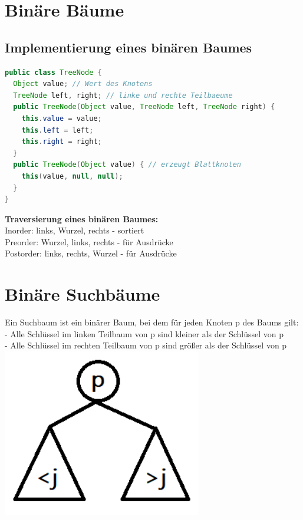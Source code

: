 \documentclass{scrreprt}
\begin{document}
\section{Binäre Bäume}
\subsection{Implementierung eines binären Baumes}
\begin{lstlisting}[language=Java]
public class TreeNode {
  Object value; // Wert des Knotens
  TreeNode left, right; // linke und rechte Teilbaeume
  public TreeNode(Object value, TreeNode left, TreeNode right) {
    this.value = value;
    this.left = left;
    this.right = right;
  }
  public TreeNode(Object value) { // erzeugt Blattknoten
    this(value, null, null);
  }
}
\end{lstlisting}
\textbf{Traversierung eines binären Baumes:}
\\ Inorder: links, Wurzel, rechts - sortiert
\\ Preorder: Wurzel, links, rechts - für Ausdrücke
\\ Postorder: links, rechts, Wurzel - für Ausdrücke
\section{Binäre Suchbäume}
Ein Suchbaum ist ein binärer Baum, bei dem für jeden Knoten p des Baums gilt:
\\ - Alle Schlüssel im linken Teilbaum von p sind kleiner als der Schlüssel von p
\\ - Alle Schlüssel im rechten Teilbaum von p sind größer als der Schlüssel von p
\\\includegraphics[width=0.65\textwidth]{graphics/Suchbaum}
\end{document}
